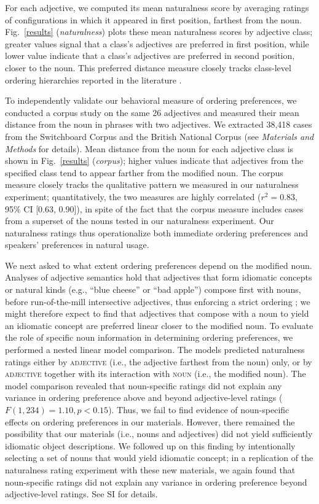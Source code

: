 \documentclass{pnastwo}
\begin{document}
\begin{article}
For each adjective, we computed its mean naturalness score by averaging ratings of configurations in which it appeared in first position, farthest from the noun. Fig.\ \ref{results} (\emph{naturalness}) plots these mean naturalness scores by adjective class; greater values signal that a class's adjectives are preferred in first position, while lower value indicate that a class's adjectives are preferred in second position, closer to the noun. This preferred distance measure closely tracks class-level ordering hierarchies reported in the literature \cite{dixon1982,sproatshih1991}.

To independently validate our behavioral measure of ordering preferences, we conducted a corpus study on the same 26 adjectives and measured their mean distance from the noun in phrases with two adjectives. We extracted 38,418 cases from the Switchboard Corpus and the British National Corpus (see \emph{Materials and Methods} for details). Mean distance from the noun for each adjective class is shown in Fig.~\ref{results} (\emph{corpus}); higher values indicate that adjectives from the specified class tend to appear farther from the modified noun. The corpus measure closely tracks the qualitative pattern we measured in our naturalness experiment; quantitatively, the two measures are highly correlated ($r^{2}=0.83$, 95\% CI [0.63, 0.90]), in spite of the fact that the corpus measure includes cases from a superset of the nouns tested in our naturalness experiment. Our naturalness ratings thus operationalize both immediate ordering preferences and speakers' preferences in natural usage.

We next asked to what extent ordering preferences depend on the modified noun. Analyses of adjective semantics hold that adjectives that form idiomatic concepts or natural kinds (e.g., ``blue cheese'' or ``bad apple'') compose first with nouns, before run-of-the-mill intersective adjectives, thus enforcing a strict ordering \cite{mcnallyboleda2004,svenonius2008}; we might therefore expect to find that adjectives that compose with a noun to yield an idiomatic concept are preferred linear closer to the modified noun. 
To evaluate the role of specific noun information in determining ordering preferences, we performed a nested linear model comparison. The models predicted naturalness ratings either by \textsc{adjective} (i.e., the adjective farthest from the noun) only, or by \textsc{adjective} together with its interaction with \textsc{noun} (i.e., the modified noun).
The model comparison revealed that noun-specific ratings did not explain any variance in ordering preference above and beyond adjective-level ratings ($F(1,234) = 1.10, p < 0.15$).  Thus, we fail to find evidence of noun-specific effects on ordering preferences in our materials. However, there remained the possibility that our materials (i.e., nouns and adjectives) did not yield sufficiently idiomatic object descriptions. We followed up on this finding by intentionally selecting a set of nouns that would yield idiomatic concept; in a replication of the naturalness rating experiment with these new materials, we again found that noun-specific ratings did not explain any variance in ordering preference beyond adjective-level ratings. See SI for details.



\end{article}
\end{document}
